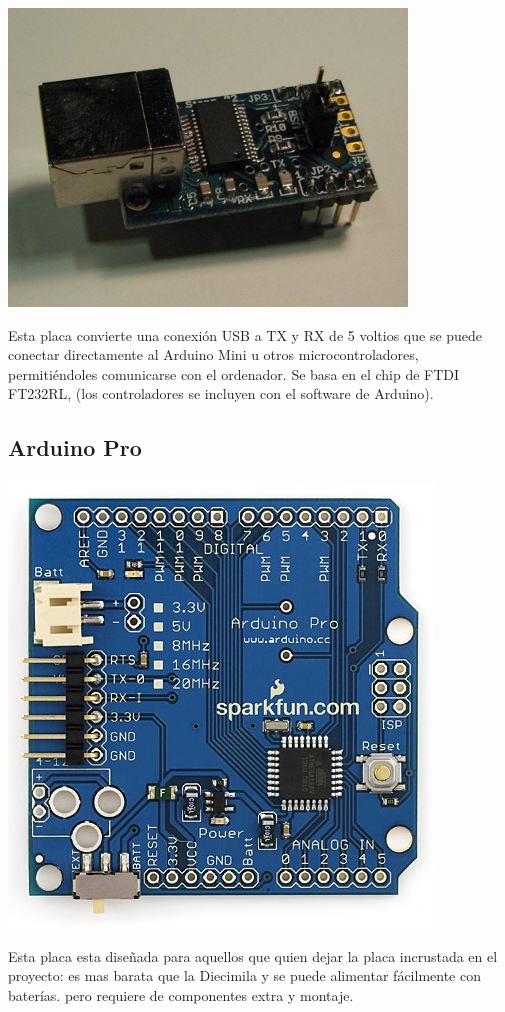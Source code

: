 \documentclass[12pt,a4paper]{report}
\begin{document}
\includegraphics[scale=0.6]{mini_usb.jpg}

Esta placa convierte una conexión USB a TX y RX de 5 voltios que se puede
conectar directamente al Arduino Mini u otros microcontroladores, permitiéndoles
comunicarse con el ordenador. Se basa en el chip de FTDI FT232RL, (los
controladores se incluyen con el software de Arduino).

\subsection{Arduino Pro}

\includegraphics[scale=0.6]{ArduinoPro.jpg}

Esta placa esta diseñada para aquellos que quien dejar la placa incrustada en el
proyecto: es mas barata que la Diecimila y se puede alimentar fácilmente con
baterías. pero requiere de componentes extra y montaje. 
\end{document}
